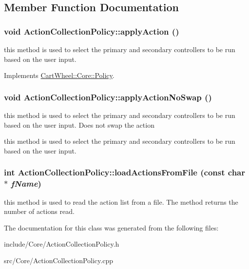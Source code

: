 \subsection{Member Function Documentation}
\hypertarget{classCartWheel_1_1Core_1_1ActionCollectionPolicy_afe57e1a3ba3f7f8463e1d1b550a57d51}{
\subsubsection[{applyAction}]{\setlength{\rightskip}{0pt plus 5cm}void ActionCollectionPolicy::applyAction ()}}
\label{classCartWheel_1_1Core_1_1ActionCollectionPolicy_afe57e1a3ba3f7f8463e1d1b550a57d51}
this method is used to select the primary and secondary controllers to be run based on the user input. 

Implements \hyperlink{classCartWheel_1_1Core_1_1Policy_acccd1ec26392309eff12c565ae9fb8c7}{CartWheel::Core::Policy}.

\hypertarget{classCartWheel_1_1Core_1_1ActionCollectionPolicy_a12bc039ce38d711ccb1f89bb395fc3a9}{
\subsubsection[{applyActionNoSwap}]{\setlength{\rightskip}{0pt plus 5cm}void ActionCollectionPolicy::applyActionNoSwap ()}}
\label{classCartWheel_1_1Core_1_1ActionCollectionPolicy_a12bc039ce38d711ccb1f89bb395fc3a9}
this method is used to select the primary and secondary controllers to be run based on the user input. Does not swap the action

this method is used to select the primary and secondary controllers to be run based on the user input. \hypertarget{classCartWheel_1_1Core_1_1ActionCollectionPolicy_a810258838684fde8a79b5df92d3eacde}{
\subsubsection[{loadActionsFromFile}]{\setlength{\rightskip}{0pt plus 5cm}int ActionCollectionPolicy::loadActionsFromFile (const char $\ast$ {\em fName})}}
\label{classCartWheel_1_1Core_1_1ActionCollectionPolicy_a810258838684fde8a79b5df92d3eacde}
this method is used to read the action list from a file. The method returns the number of actions read. 

The documentation for this class was generated from the following files:\begin{DoxyCompactItemize}
\item 
include/Core/ActionCollectionPolicy.h\item 
src/Core/ActionCollectionPolicy.cpp\end{DoxyCompactItemize}
